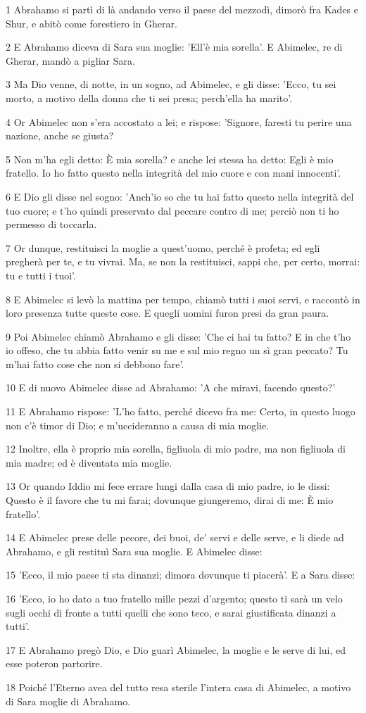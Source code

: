 \par 1 Abrahamo si partì di là andando verso il paese del mezzodì, dimorò fra Kades e Shur, e abitò come forestiero in Gherar.
\par 2 E Abrahamo diceva di Sara sua moglie: 'Ell'è mia sorella'. E Abimelec, re di Gherar, mandò a pigliar Sara.
\par 3 Ma Dio venne, di notte, in un sogno, ad Abimelec, e gli disse: 'Ecco, tu sei morto, a motivo della donna che ti sei presa; perch'ella ha marito'.
\par 4 Or Abimelec non s'era accostato a lei; e rispose: 'Signore, faresti tu perire una nazione, anche se giusta?
\par 5 Non m'ha egli detto: È mia sorella? e anche lei stessa ha detto: Egli è mio fratello. Io ho fatto questo nella integrità del mio cuore e con mani innocenti'.
\par 6 E Dio gli disse nel sogno: 'Anch'io so che tu hai fatto questo nella integrità del tuo cuore; e t'ho quindi preservato dal peccare contro di me; perciò non ti ho permesso di toccarla.
\par 7 Or dunque, restituisci la moglie a quest'uomo, perché è profeta; ed egli pregherà per te, e tu vivrai. Ma, se non la restituisci, sappi che, per certo, morrai: tu e tutti i tuoi'.
\par 8 E Abimelec si levò la mattina per tempo, chiamò tutti i suoi servi, e raccontò in loro presenza tutte queste cose. E quegli uomini furon presi da gran paura.
\par 9 Poi Abimelec chiamò Abrahamo e gli disse: 'Che ci hai tu fatto? E in che t'ho io offeso, che tu abbia fatto venir su me e sul mio regno un sì gran peccato? Tu m'hai fatto cose che non si debbono fare'.
\par 10 E di nuovo Abimelec disse ad Abrahamo: 'A che miravi, facendo questo?'
\par 11 E Abrahamo rispose: 'L'ho fatto, perché dicevo fra me: Certo, in questo luogo non c'è timor di Dio; e m'uccideranno a causa di mia moglie.
\par 12 Inoltre, ella è proprio mia sorella, figliuola di mio padre, ma non figliuola di mia madre; ed è diventata mia moglie.
\par 13 Or quando Iddio mi fece errare lungi dalla casa di mio padre, io le dissi: Questo è il favore che tu mi farai; dovunque giungeremo, dirai di me: È mio fratello'.
\par 14 E Abimelec prese delle pecore, dei buoi, de' servi e delle serve, e li diede ad Abrahamo, e gli restituì Sara sua moglie. E Abimelec disse:
\par 15 'Ecco, il mio paese ti sta dinanzi; dimora dovunque ti piacerà'. E a Sara disse:
\par 16 'Ecco, io ho dato a tuo fratello mille pezzi d'argento; questo ti sarà un velo sugli occhi di fronte a tutti quelli che sono teco, e sarai giustificata dinanzi a tutti'.
\par 17 E Abrahamo pregò Dio, e Dio guarì Abimelec, la moglie e le serve di lui, ed esse poteron partorire.
\par 18 Poiché l'Eterno avea del tutto resa sterile l'intera casa di Abimelec, a motivo di Sara moglie di Abrahamo.

